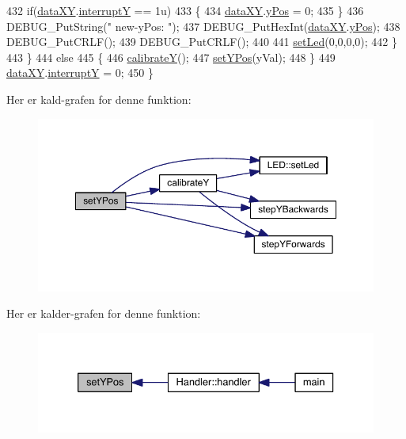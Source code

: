 \begin{DoxyCode}
432       \textcolor{keywordflow}{if}(\hyperlink{data_8h_a89d7998a721b3f36f9f4131e7a5e42d2}{dataXY}.\hyperlink{data_8h_a0149ea97a32442280eb1c0b30c1eeaf1}{interruptY} == 1u)
433       \{
434         \hyperlink{data_8h_a89d7998a721b3f36f9f4131e7a5e42d2}{dataXY}.\hyperlink{data_8h_a4c7347df04ab0f3d860046571be08af4}{yPos} = 0;
435       \}
436       DEBUG\_PutString(\textcolor{stringliteral}{" new-yPos: "});
437       DEBUG\_PutHexInt(\hyperlink{data_8h_a89d7998a721b3f36f9f4131e7a5e42d2}{dataXY}.\hyperlink{data_8h_a4c7347df04ab0f3d860046571be08af4}{yPos});
438       DEBUG\_PutCRLF();
439       DEBUG\_PutCRLF();
440       
441       \hyperlink{led_8h_a1d8e725e3829da99c1d027ba0a2ce57a}{setLed}(0,0,0,0);
442     \}
443   \}
444   \textcolor{keywordflow}{else}
445   \{
446     \hyperlink{class_x_y_a86751f168bdc352fa109644298829609}{calibrateY}();
447     \hyperlink{class_x_y_adbc3a49d939491e88137a7677ad889f3}{setYPos}(yVal);
448   \}
449   \hyperlink{data_8h_a89d7998a721b3f36f9f4131e7a5e42d2}{dataXY}.\hyperlink{data_8h_a0149ea97a32442280eb1c0b30c1eeaf1}{interruptY} = 0;
450 \}
\end{DoxyCode}


Her er kald-\/grafen for denne funktion\+:
\nopagebreak
\begin{figure}[H]
\begin{center}
\leavevmode
\includegraphics[width=350pt]{db/d87/class_x_y_adbc3a49d939491e88137a7677ad889f3_cgraph}
\end{center}
\end{figure}




Her er kalder-\/grafen for denne funktion\+:
\nopagebreak
\begin{figure}[H]
\begin{center}
\leavevmode
\includegraphics[width=333pt]{db/d87/class_x_y_adbc3a49d939491e88137a7677ad889f3_icgraph}
\end{center}
\end{figure}


